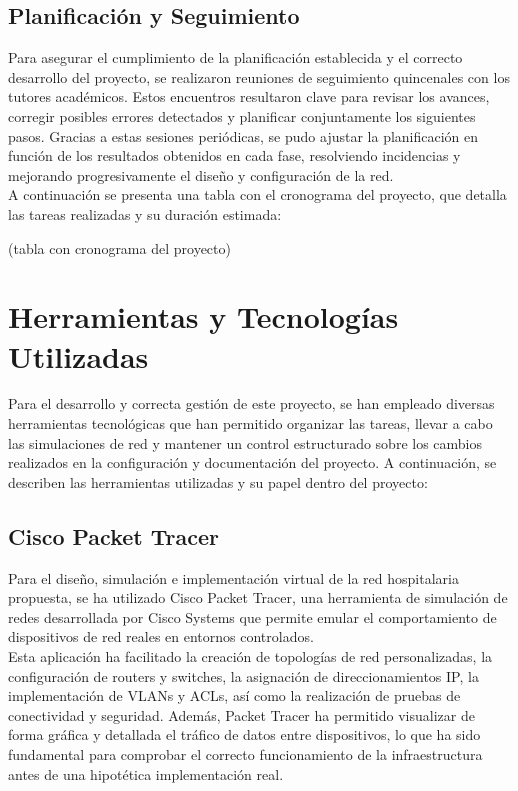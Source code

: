 \subsection{Planificación y Seguimiento}
Para asegurar el cumplimiento de la planificación establecida y el correcto desarrollo del proyecto, se realizaron reuniones de seguimiento quincenales con los tutores 
académicos. Estos encuentros resultaron clave para revisar los avances, corregir posibles errores detectados y planificar conjuntamente los siguientes pasos. Gracias a 
estas sesiones periódicas, se pudo ajustar la planificación en función de los resultados obtenidos en cada fase, resolviendo incidencias y mejorando progresivamente el 
diseño y configuración de la red. \\

A continuación se presenta una tabla con el cronograma del proyecto, que detalla las tareas realizadas y su duración estimada:

(tabla con cronograma del proyecto)

\section{Herramientas y Tecnologías Utilizadas}
Para el desarrollo y correcta gestión de este proyecto, se han empleado diversas herramientas tecnológicas que han permitido organizar las tareas, llevar a cabo las 
simulaciones de red y mantener un control estructurado sobre los cambios realizados en la configuración y documentación del proyecto. A continuación, se describen 
las herramientas utilizadas y su papel dentro del proyecto:

\subsection{Cisco Packet Tracer}
Para el diseño, simulación e implementación virtual de la red hospitalaria propuesta, se ha utilizado Cisco Packet Tracer, una herramienta de simulación de redes 
desarrollada por Cisco Systems que permite emular el comportamiento de dispositivos de red reales en entornos controlados.\\
Esta aplicación ha facilitado la creación de topologías de red personalizadas, la configuración de routers y switches, la asignación de direccionamientos IP, la 
implementación de VLANs y ACLs, así como la realización de pruebas de conectividad y seguridad. Además, Packet Tracer ha permitido visualizar de forma gráfica y 
detallada el tráfico de datos entre dispositivos, lo que ha sido fundamental para comprobar el correcto funcionamiento de la infraestructura antes de una hipotética 
implementación real.

